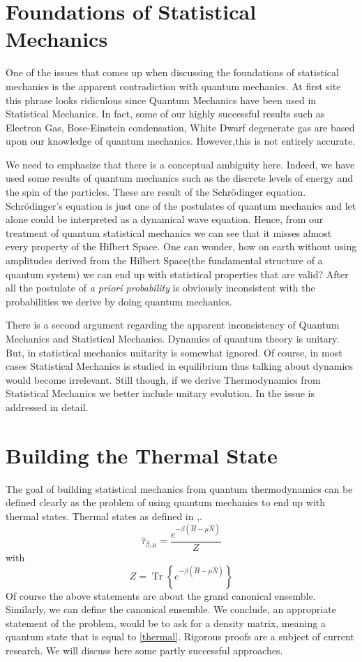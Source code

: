 \documentclass[a4paper,12pt]{article}
\begin{document}
\section{Foundations of Statistical Mechanics}\par
One of the issues that comes up when discussing the foundations of statistical mechanics is the apparent contradiction with quantum mechanics. At first site this phrase looks ridiculous since Quantum Mechanics have been used in Statistical Mechanics. In fact, some of our highly successful results such as Electron Gas, Bose-Einstein condensation, White Dwarf degenerate gas are based upon our knowledge of quantum mechanics. However,this is not entirely accurate.
\par  We need to emphasize that there is a conceptual ambiguity here. Indeed, we have used some results of quantum mechanics such as the discrete levels of energy and the spin of the particles. These are result of the Schr\"odinger
equation. Schr\"odinger's equation is just one of the postulates of quantum mechanics and let alone could be interpreted as a dynamical wave equation. Hence, from our treatment of quantum 
statistical mechanics we can see that it misses almost every property of the Hilbert Space. One can wonder, how on earth without using amplitudes derived from the Hilbert Space(the fundamental structure of a quantum system) we can end up with statistical properties that are valid? After all the postulate of \textit{a priori probability} is obviously inconsistent with the probabilities we derive by doing quantum mechanics.\par
There is a second argument regarding the apparent inconsistency of Quantum Mechanics and Statistical Mechanics. Dynamics of quantum theory is unitary. But, in statistical mechanics unitarity is somewhat ignored. Of course, in most cases Statistical Mechanics is studied in equilibrium thus talking about dynamics would become irrelevant. Still though, if we derive Thermodynamics from Statistical Mechanics we better include unitary evolution. In \cite{goold2016role} the issue is addressed in detail.
\section{Building the Thermal State}
The goal of building statistical mechanics from quantum thermodynamics can be defined clearly as the problem of using quantum mechanics to end up with thermal states. Thermal states as defined in \cite{PATHRIA2011115},\cite{potts2019introduction}.
\begin{equation}\hat{\tau}_{\beta, \mu}=\frac{e^{-\beta(\hat{H}-\mu \hat{N})}}{Z}
\label{thermal}
\end{equation}
with
\begin{equation}
Z=\operatorname{Tr}\left\{e^{-\beta(\hat{H}-\mu \hat{N})}\right\}
\end{equation}
Of course the above statements are about the grand canonical ensemble. Similarly, we can define the canonical ensemble. We conclude, an appropriate statement of the problem, would be to ask for a density matrix, meaning a quantum state that is equal to \eqref{thermal}. Rigorous proofs are a subject of current research. We will discuss here some partly successful approaches.
\end{document}
